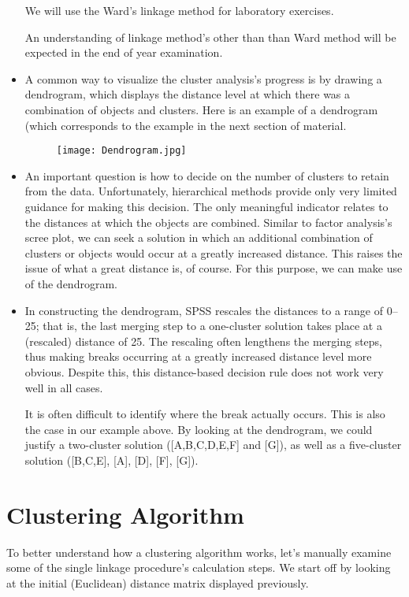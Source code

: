 \documentclass[a4paper,12pt]{article}
\begin{document}
\begin{itemize}
We will use the Ward's linkage method for laboratory exercises.


An understanding of linkage method's other than than Ward method will be expected in the end of year examination.

\item A common way to visualize the cluster analysis’s progress is by drawing a
dendrogram, which displays the distance level at which there was a combination
of objects and clusters.
Here is an example of a dendrogram (which corresponds to the example in the next section of material.


\begin{figure}[h!]
\begin{center}
  \texttt{[image: Dendrogram.jpg]}\\
\end{center}
\end{figure}

\item An important question is how to decide on the number of
clusters to retain from the data. Unfortunately, hierarchical methods provide only
very limited guidance for making this decision. The only meaningful indicator
relates to the distances at which the objects are combined. Similar to factor
analysis’s scree plot, we can seek a solution in which an additional combination
of clusters or objects would occur at a greatly increased distance. This raises the
issue of what a great distance is, of course. For this purpose, we can make use of the dendrogram.

\item In constructing the dendrogram, SPSS rescales the distances to a range
of 0–25; that is, the last merging step to a one-cluster solution takes place at a
(rescaled) distance of 25. The rescaling often lengthens the merging steps, thus
making breaks occurring at a greatly increased distance level more obvious.
Despite this, this distance-based decision rule does not work very well in all
cases.

It is often difficult to identify where the break actually occurs. This is also
the case in our example above. By looking at the dendrogram, we could justify
a two-cluster solution ([A,B,C,D,E,F] and [G]), as well as a five-cluster solution
([B,C,E], [A], [D], [F], [G]).


\end{itemize}
\newpage
\section{Clustering Algorithm}
To better understand how a clustering algorithm works, let’s manually examine
some of the single linkage procedure’s calculation steps. We start off by looking at
the initial (Euclidean) distance matrix displayed previously.
\end{document}
